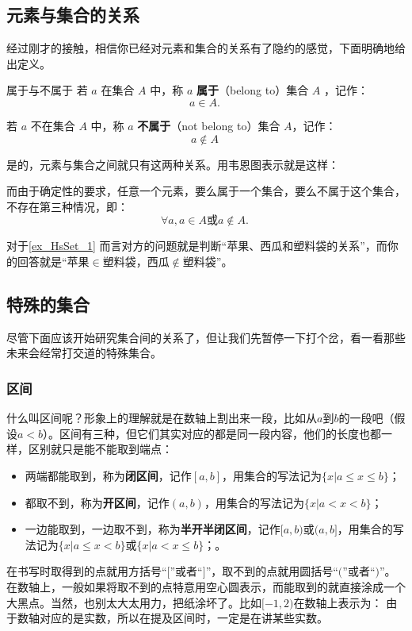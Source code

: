 \subsection{元素与集合的关系}

经过刚才的接触，相信你已经对元素和集合的关系有了隐约的感觉，下面明确地给出定义。

\begin{definition}{属于与不属于}
若 $a$ 在集合 $A$ 中，称 $a$ \textbf{属于}（belong to）集合 $A$ ，记作：
\begin{equation}
a \in A.~
\end{equation}

若 $a$ 不在集合 $A$ 中，称 $a$ \textbf{不属于}（not belong to）集合 $A$，记作：
\begin{equation}
a\notin A~
\end{equation}
\end{definition}
是的，元素与集合之间就只有这两种关系。用韦恩图表示就是这样：

而由于确定性的要求，任意一个元素，要么属于一个集合，要么不属于这个集合，不存在第三种情况，即：
\begin{equation}
\forall a,a\in A\text{或}a\not\in A.~
\end{equation}

对于\autoref{ex_HsSet_1} 而言对方的问题就是判断“苹果、西瓜和塑料袋的关系”，而你的回答就是“苹果$\in$塑料袋，西瓜$\notin$塑料袋”。

\subsection{特殊的集合}

尽管下面应该开始研究集合间的关系了，但让我们先暂停一下打个岔，看一看那些未来会经常打交道的特殊集合。

\subsubsection{区间}

什么叫区间呢？形象上的理解就是在数轴上割出来一段，比如从$a$到$b$的一段吧（假设$a<b$）。区间有三种，但它们其实对应的都是同一段内容，他们的长度也都一样，区别就只是能不能取到端点：
\begin{itemize}
\item 两端都能取到，称为\textbf{闭区间}，记作$[a,b]$，用集合的写法记为$\{x|a\leq x\leq b\}$；
\item 都取不到，称为\textbf{开区间}，记作$(a,b)$，用集合的写法记为$\{x|a< x<b\}$；
\item 一边能取到，一边取不到，称为\textbf{半开半闭区间}，记作$[a,b)$或$(a,b]$，用集合的写法记为$\{x|a\leq x< b\}$或$\{x|a< x\leq b\}$；。
\end{itemize}
在书写时取得到的点就用方括号“$[$”或者“$]$”，取不到的点就用圆括号“$($”或者“$)$”。
在数轴上，一般如果将取不到的点特意用空心圆表示，而能取到的就直接涂成一个大黑点。当然，也别太大太用力，把纸涂坏了。比如$[-1,2)$在数轴上表示为：
\addTODO{画个数轴的图，[-1,2)的区间}
由于数轴对应的是实数，所以在提及区间时，一定是在讲某些实数。

